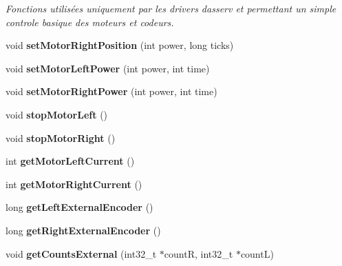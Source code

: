 \begin{DoxyCompactItemize}
\begin{DoxyCompactList}\small\item\em Fonctions utilisées uniquement par les drivers d\textquotesingle{}asserv et permettant un simple controle basique des moteurs et codeurs. \end{DoxyCompactList}\item 
\mbox{\label{classAsservEsialR_aad4a4c018d773f75ede78df09aa64bf3}} 
void {\bfseries set\+Motor\+Right\+Position} (int power, long ticks)
\item 
\mbox{\label{classAsservEsialR_ae3632c60b6f31fc32b514c73f40dd23c}} 
void {\bfseries set\+Motor\+Left\+Power} (int power, int time)
\item 
\mbox{\label{classAsservEsialR_ad235409b0ed65c2718c25a7122c69117}} 
void {\bfseries set\+Motor\+Right\+Power} (int power, int time)
\item 
\mbox{\label{classAsservEsialR_a402c8f20afb5fb72549f009867b9f71c}} 
void {\bfseries stop\+Motor\+Left} ()
\item 
\mbox{\label{classAsservEsialR_a3ef22117ab4bbc5113863599fb0896fe}} 
void {\bfseries stop\+Motor\+Right} ()
\item 
\mbox{\label{classAsservEsialR_ac80a3f0c2469353e35ec7f735e655249}} 
int {\bfseries get\+Motor\+Left\+Current} ()
\item 
\mbox{\label{classAsservEsialR_a213883db355e8a7713a324cd634d6e1b}} 
int {\bfseries get\+Motor\+Right\+Current} ()
\item 
\mbox{\label{classAsservEsialR_a92f56a44000674916dbb398c6a08d75a}} 
long {\bfseries get\+Left\+External\+Encoder} ()
\item 
\mbox{\label{classAsservEsialR_ab912ed84c7ed08b14e2d5c0765bc9cac}} 
long {\bfseries get\+Right\+External\+Encoder} ()
\item 
\mbox{\label{classAsservEsialR_abd83aa700363ae921569e178df53f95d}} 
void {\bfseries get\+Counts\+External} (int32\+\_\+t $\ast$countR, int32\+\_\+t $\ast$countL)

\end{DoxyCompactItemize}
